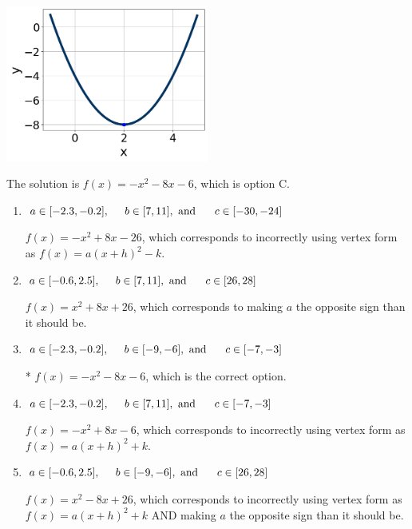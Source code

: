 \documentclass{extbook}[14pt]
\begin{document}
\begin{enumerate}
{\begin{center}
    \includegraphics[width=0.5\textwidth]{../Figures/quadraticGraphToEquationB.png}
\end{center}


The solution is \( f(x) = -x^{2} -8 x -6 \), which is option C.\begin{enumerate}[label=\Alph*.]
\item \( a \in [-2.3, -0.2], \hspace*{5mm} b \in [7, 11], \text{ and } \hspace*{5mm} c \in [-30, -24] \)

$f(x)=-x^{2} +8 x -26$, which corresponds to incorrectly using vertex form as $f(x) = a(x+h)^2 - k$.
\item \( a \in [-0.6, 2.5], \hspace*{5mm} b \in [7, 11], \text{ and } \hspace*{5mm} c \in [26, 28] \)

$f(x)=x^{2} +8 x + 26$, which corresponds to making $a$ the opposite sign than it should be.
\item \( a \in [-2.3, -0.2], \hspace*{5mm} b \in [-9, -6], \text{ and } \hspace*{5mm} c \in [-7, -3] \)

* $f(x)=-x^{2} -8 x -6$, which is the correct option.
\item \( a \in [-2.3, -0.2], \hspace*{5mm} b \in [7, 11], \text{ and } \hspace*{5mm} c \in [-7, -3] \)

$f(x)=-x^{2} +8 x -6$, which corresponds to incorrectly using vertex form as $f(x) = a(x+h)^2+k$.
\item \( a \in [-0.6, 2.5], \hspace*{5mm} b \in [-9, -6], \text{ and } \hspace*{5mm} c \in [26, 28] \)

$f(x)=x^{2} -8 x + 26$, which corresponds to incorrectly using vertex form as $f(x) = a(x+h)^2+k$ AND making $a$ the opposite sign than it should be.
\end{enumerate}

}
\end{enumerate}
\end{document}
